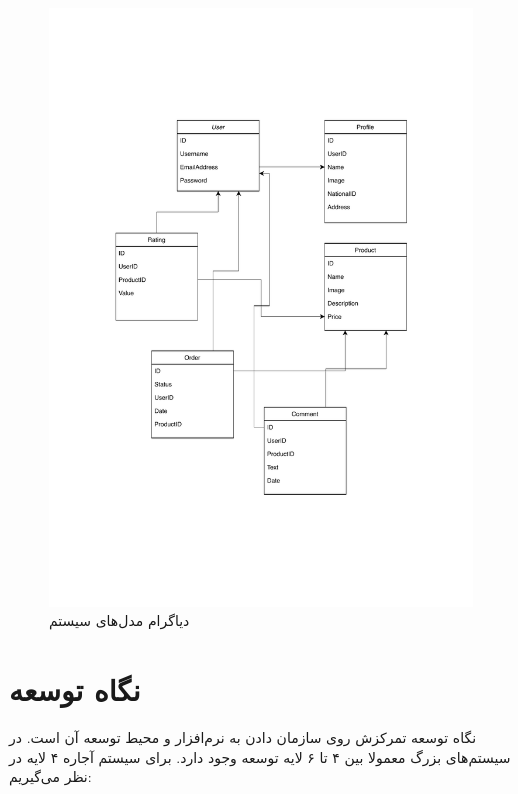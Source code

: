 \begin{figure}
\centering
\includegraphics[width=\textwidth]{diagrams/diagram.pdf}
\caption{دیاگرام مدل‌های سیستم}
\label{uml}
\end{figure}

\section*{
نگاه توسعه
}

نگاه توسعه تمرکزش روی سازمان دادن به نرم‌افزار و محیط توسعه آن است. در سیستم‌های بزرگ معمولا بین ۴ تا ۶ لایه توسعه وجود دارد. برای سیستم آجاره ۴ لایه در نظر می‌گیریم:

